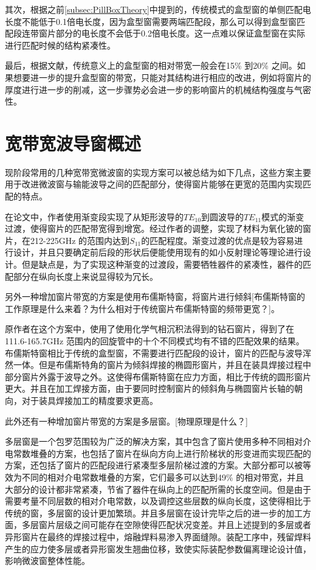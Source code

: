 \documentclass[master]{thesis-uestc}
\begin{document}
其次，根据之前\ref{subsec:PillBoxTheory}中提到的，传统模式的盒型窗的单侧匹配电长度不能低于0.1倍电长度，因为盒型窗需要两端匹配段，那么可以得到盒型窗匹配段连带窗片部分的电长度不会低于0.2倍电长度。这一点难以保证盒型窗在实际进行匹配时候的结构紧凑性。

最后，根据文献\cite{huxiongli_bandwidth_pill}，传统意义上的盒型窗的相对带宽一般会在15\% 到20\% 之间。如果想要进一步的提升盒型窗的带宽，只能对其结构进行相应的改进，例如将窗片的厚度进行进一步的削减，这一步骤势必会进一步的影响窗片的机械结构强度与气密性。
\section{宽带宽波导窗概述}
现阶段常用的几种宽带宽微波窗的实现方案可以被总结为如下几点，这些方案主要用于改进微波窗与输能波导之间的匹配部分，使得窗片能够在更宽的范围内实现匹配的特点。

在论文\cite{cook_broadband_2013_gradually}中，作者使用渐变段实现了从矩形波导的$TE_{10}$到圆波导的$TE_{11}$模式的渐变过渡，使得窗片的匹配带宽得到增宽。经过作者的调整，实现了材料为氧化铍的窗片，在212-225GHz 的范围内达到$S_{11}$的匹配程度。渐变过渡的优点是较为容易进行设计，并且只要确定前后段的形状后便能使用现有的如小反射理论等理论进行设计。但是缺点是，为了实现这种渐变的过渡段，需要牺牲器件的紧凑性，器件的匹配部分在纵向长度上来说显得较为冗长。

另外一种增加窗片带宽的方案是使用布儒斯特窗，将窗片进行倾斜[布儒斯特窗的工作原理是什么来着？为什么相对于传统窗片布儒斯特窗的频带更宽？]。

原作者在这个方案中，使用了使用化学气相沉积法得到的钻石窗片，得到了在111.6-165.7GHz 范围内的回旋管中的十个不同模式均有不错的匹配效果的结果。布儒斯特窗相比于传统的盒型窗，不需要进行匹配段的设计，窗片的匹配与波导浑然一体。但是布儒斯特角的窗片为倾斜焊接的椭圆形窗片，并且在装具焊接过程中部分窗片外露于波导之外。这使得布儒斯特窗在应力方面，相比于传统的圆形窗片更大。并且在加工焊接方面，由于要同时控制窗片的倾斜角与椭圆窗片长轴的朝向，对于装具焊接加工的精度要求更高。

此外还有一种增加窗片带宽的方案是多层窗。[物理原理是什么？]

多层窗是一个包罗范围较为广泛的解决方案，其中包含了窗片使用多种不同相对介电常数堆叠的方案，也包括了窗片在纵向方向上进行阶梯状的形变进而实现匹配的方案，还包括了窗片的匹配段进行紧凑型多层阶梯过渡的方案。大部分都可以被等效为不同的相对介电常数堆叠的方案，它们最多可以达到49\% 的相对带宽，并且大部分的设计都非常紧凑，节省了器件在纵向上的匹配所需的长度空间。但是由于需要考量不同层数的相对介电常数，以及调控这些层数的纵向长度，这使得相比于传统的窗，多层窗的设计更加繁琐。并且多层窗在设计完毕之后的进一步的加工方面，多层窗片层级之间可能存在空隙使得匹配状况变差。并且上述提到的多层或者异形窗片在最终的焊接过程中，熔融焊料易渗入界面缝隙。装配工序中，残留焊料产生的应力使多层或者异形窗发生翘曲位移，致使实际装配参数偏离理论设计值，影响微波窗整体性能。
\end{document}
